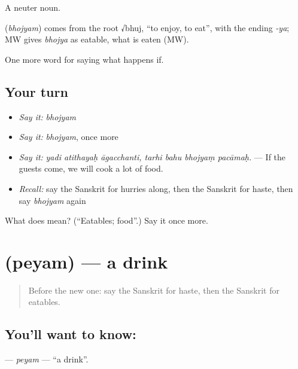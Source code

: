 A neuter noun.

\begin{cousinweb}
\textbf{} (\emph{bhojyam}) comes from the root √bhuj, \textquotedblleft{}to enjoy, to eat\textquotedblright{}, with the ending \emph{-ya}; MW gives \emph{bhojya} as eatable, what is eaten (MW).
\end{cousinweb}

\begin{grammarlens}[title={What you've built}]
One more word for saying what happens if.
\end{grammarlens}

\subsection*{Your turn}
\begin{itemize}
\raggedright
  \item \emph{Say it:} \emph{bhojyam}
  \item \emph{Say it:} \emph{bhojyam}, once more
  \item \emph{Say it:} \emph{yadi atithayaḥ āgacchanti, tarhi bahu bhojyaṃ pacāmaḥ.} — If the guests come, we will cook a lot of food.
  \item \emph{Recall:} say the Sanskrit for hurries along, then the Sanskrit for haste, then say \emph{bhojyam} again
\end{itemize}

\begin{tcolorbox}[breakable,colback=teal!4,colframe=teal!35!black,title={Before you move on}]
What does  mean? (\textquotedblleft{}Eatables; food\textquotedblright{}.) Say it once more.
\end{tcolorbox}
\section[\texorpdfstring{\sk{पेयम्} (peyam)}{पेयम् (peyam)}]{ (peyam) — a drink}

\label{lesson:SA-C530-peyam}



\begin{quote}
Before the new one: say the Sanskrit for haste, then the Sanskrit for eatables.
\end{quote}

\subsection*{You'll want to know: }
\textbf{} — \emph{peyam} — \textquotedblleft{}a drink\textquotedblright{}.

